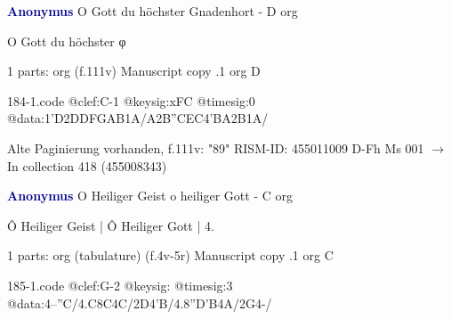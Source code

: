\documentclass[twocolumn]{book}
\begin{document}
\newline \par \vspace{7pt} \textcolor{darkblue}{\textbf{Anonymus  }}
\newline O Gott du höchster Gnadenhort - D
\newline org
\newline \begin{itshape}[f.111v, heading:] O Gott du höchster φ\end{itshape} 
\newline \textcolor{darkblue}{}  1 parts: org  (f.111v)
\newline Manuscript copy
.1  org  D  
\begin{filecontents*}{184-1.code}
@clef:C-1
@keysig:xFC
@timesig:0
@data:1'D2DDFGAB1A/A2B''CEC4'BA2B1A/
\end{filecontents*}
\newline
%

\newline Alte Paginierung vorhanden, f.111v: "89"
\newline RISM-ID: 455011009
\newline D-Fh  Ms 001
\newline $\rightarrow$ In collection 418 (455008343)
      
\newline \par \vspace{7pt} \textcolor{darkblue}{\textbf{Anonymus  }}
\newline O Heiliger Geist o heiliger Gott - C
\newline org
\newline \begin{itshape}[f.4v, at left:] Ô Heiliger Geist | Ô Heiliger Gott | 4.\end{itshape} 
\newline \textcolor{darkblue}{}  1 parts: org (tabulature)  (f.4v-5r)
\newline Manuscript copy
.1  org  C  
\begin{filecontents*}{185-1.code}
@clef:G-2
@keysig:
@timesig:3
@data:4--''C/4.C8C4C/2D4'B/4.8''D'B4A/2G4-/
\end{filecontents*}
\newline
%
\end{document}
